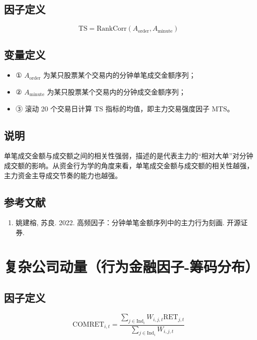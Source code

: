 \documentclass{article}
\begin{document}
\subsection{因子定义}
\begin{equation}
    \mathrm{TS} = \mathrm{RankCorr}(A_{\mathrm{order}}, A_{\mathrm{minute}})
\end{equation}

\subsection{变量定义}
\begin{itemize}
    \item ① \( A_{\mathrm{order}} \) 为某只股票某个交易内的分钟单笔成交金额序列；
    \item ② \( A_{\mathrm{minute}} \) 为某只股票某个交易内的分钟成交金额序列；
    \item ③ 滚动 20 个交易日计算 \( \mathrm{TS} \) 指标的均值，即主力交易强度因子 \( \mathrm{MTS} \)。
\end{itemize}

\subsection{说明}
单笔成交金额与成交额之间的相关性强弱，描述的是代表主力的“相对大单”对分钟成交额的影响。从资金行为学的角度来看，单笔成交金额与成交额的相关性越强，主力资金主导成交节奏的能力也越强。

\subsection{参考文献}
\begin{enumerate}
    \item 姚建榕, 苏良. 2022. 高频因子：分钟单笔金额序列中的主力行为刻画. 开源证券.
\end{enumerate}

\section{复杂公司动量（行为金融因子-筹码分布）}

\subsection{因子定义}
\begin{equation}
    \mathrm{COMRET}_{i,t} = \frac{\sum_{j \in \mathrm{Ind}_i} W_{i,j,t} \mathrm{RET}_{j,t}}{\sum_{j \in \mathrm{Ind}_i} W_{i,j,t}}
\end{equation}
\end{document}
